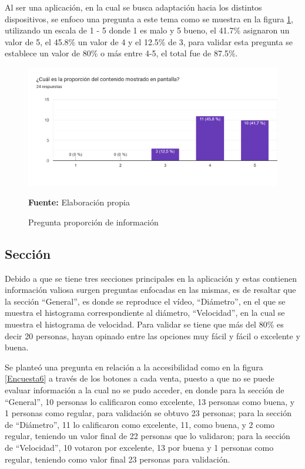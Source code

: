 \documentclass[12pt,twocolumn,a4paper]{article}
\begin{document}
Al ser una aplicación, en la cual se busca adaptación hacia los distintos dispositivos, se enfoco una pregunta a este tema como se muestra en la figura \ref{Encuesta5}, utilizando un escala de 1 - 5 donde 1 es malo y 5 bueno, el 41.7\% asignaron un valor de 5, el 45.8\% un valor de 4 y el 12.5\% de 3, para validar esta pregunta se establece  un valor de 80\% o más entre 4-5, el total fue de 87.5\%.

\begin{figure}
	\centering
	\includegraphics[scale=0.3]{Encuesta5.png}
	\caption{Pregunta proporción de información} \textbf{Fuente:} Elaboración propia 
	\label{Encuesta5}
\end{figure}

\subsection{Sección}

Debido a que se tiene tres secciones principales en la aplicación y estas contienen información valiosa surgen preguntas enfocadas en las mismas, es de resaltar que la sección “General”, es  donde se reproduce el vídeo, “Diámetro”, en el que se muestra el histograma correspondiente al diámetro, “Velocidad”, en la cual se muestra el histograma de velocidad. Para validar se tiene que más del 80\%  es decir 20 personas, hayan opinado entre las opciones muy fácil y fácil o excelente y buena.

Se planteó una pregunta en relación a la accesibilidad como en la figura \ref{Encuesta6} a través de los botones a cada venta, puesto a que no se puede evaluar información a la cual no se pudo acceder, en donde para la sección de “General”, 10 personas lo calificaron como excelente, 13 personas como buena, y 1 personas como regular, para validación se obtuvo 23 personas; para la sección de “Diámetro”, 11 lo calificaron como excelente, 11, como  buena, y 2 como regular, teniendo un valor final de 22 personas que lo validaron; para la sección de “Velocidad”, 10 votaron por excelente, 13 por  buena y 1 personas como regular, teniendo como valor final 23 personas para validación.
\end{document}

